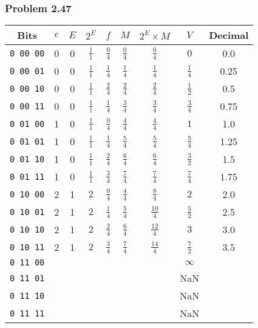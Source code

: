 \documentclass[a4paper]{article}
\begin{document}
\subsubsection*{Problem 2.47}
\begin{tabular}{ccccccccc}
    Bits&$e$&$E$&$2^E$&$f$&$M$&$2^E\times M$&$V$&Decimal\\\hline
    \tt{0 00 00}&0&0&$\frac{1}{1}$&$\frac{0}{4}$&$\frac{0}{4}$&$\frac{0}{4}$&$0$&0.0\\\hline
    \tt{0 00 01}&0&0&$\frac{1}{1}$&$\frac{1}{4}$&$\frac{1}{4}$&$\frac{1}{4}$&$\frac{1}{4}$&0.25\\\hline
    \tt{0 00 10}&0&0&$\frac{1}{1}$&$\frac{2}{4}$&$\frac{2}{4}$&$\frac{2}{4}$&$\frac{1}{2}$&0.5\\\hline
    \tt{0 00 11}&0&0&$\frac{1}{1}$&$\frac{1}{4}$&$\frac{3}{4}$&$\frac{3}{4}$&$\frac{3}{4}$&0.75\\\hline
    \tt{0 01 00}&1&0&$\frac{1}{1}$&$\frac{0}{4}$&$\frac{4}{4}$&$\frac{4}{4}$&$1$&1.0\\\hline
    \tt{0 01 01}&1&0&$\frac{1}{1}$&$\frac{1}{4}$&$\frac{5}{4}$&$\frac{5}{4}$&$\frac{5}{4}$&1.25\\\hline
    \tt{0 01 10}&1&0&$\frac{1}{1}$&$\frac{2}{4}$&$\frac{6}{4}$&$\frac{6}{4}$&$\frac{3}{2}$&1.5\\\hline
    \tt{0 01 11}&1&0&$\frac{1}{1}$&$\frac{3}{4}$&$\frac{7}{4}$&$\frac{7}{4}$&$\frac{7}{4}$&1.75\\\hline
    \tt{0 10 00}&2&1&$2$&$\frac{0}{4}$&$\frac{4}{4}$&$\frac{8}{4}$&$2$&2.0\\\hline
    \tt{0 10 01}&2&1&$2$&$\frac{1}{4}$&$\frac{5}{4}$&$\frac{10}{4}$&$\frac{5}{2}$&2.5\\\hline
    \tt{0 10 10}&2&1&$2$&$\frac{2}{4}$&$\frac{6}{4}$&$\frac{12}{4}$&$3$&3.0\\\hline
    \tt{0 10 11}&2&1&$2$&$\frac{3}{4}$&$\frac{7}{4}$&$\frac{14}{4}$&$\frac{7}{2}$&3.5\\\hline
    \tt{0 11 00}&&&&&&&$\infty$&\\\hline
    \tt{0 11 01}&&&&&&&NaN&\\\hline
    \tt{0 11 10}&&&&&&&NaN&\\\hline
    \tt{0 11 11}&&&&&&&NaN&\\\hline

\end{tabular}

\end{document}
